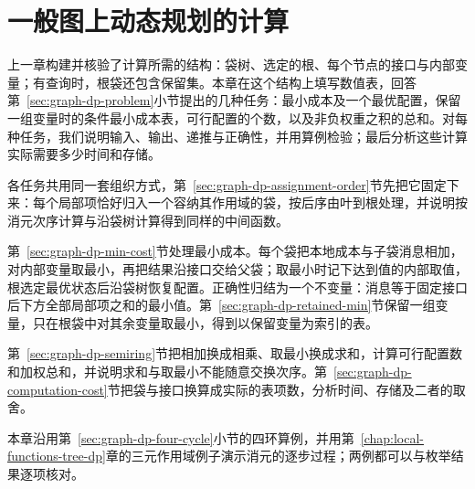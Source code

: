 \chapter{一般图上动态规划的计算}
\label{sec:graph-bag-dp}
\label{chap:general-graph-dp-computation}

上一章构建并核验了计算所需的结构：袋树、选定的根、每个节点的接口与内部变量；有查询时，根袋还包含保留集。本章在这个结构上填写数值表，回答第~\ref{sec:graph-dp-problem}小节提出的几种任务：最小成本及一个最优配置，保留一组变量时的条件最小成本表，可行配置的个数，以及非负权重之积的总和。对每种任务，我们说明输入、输出、递推与正确性，并用算例检验；最后分析这些计算实际需要多少时间和存储。

各任务共用同一套组织方式，第~\ref{sec:graph-dp-assignment-order}节先把它固定下来：每个局部项恰好归入一个容纳其作用域的袋，按后序由叶到根处理，并说明按消元次序计算与沿袋树计算得到同样的中间函数。

第~\ref{sec:graph-dp-min-cost}节处理最小成本。每个袋把本地成本与子袋消息相加，对内部变量取最小，再把结果沿接口交给父袋；取最小时记下达到值的内部取值，根选定最优状态后沿袋树恢复配置。正确性归结为一个不变量：消息等于固定接口后下方全部局部项之和的最小值。第~\ref{sec:graph-dp-retained-min}节保留一组变量，只在根袋中对其余变量取最小，得到以保留变量为索引的表。

第~\ref{sec:graph-dp-semiring}节把相加换成相乘、取最小换成求和，计算可行配置数和加权总和，并说明求和与取最小不能随意交换次序。第~\ref{sec:graph-dp-computation-cost}节把袋与接口换算成实际的表项数，分析时间、存储及二者的取舍。

本章沿用第~\ref{sec:graph-dp-four-cycle}小节的四环算例，并用第~\ref{chap:local-functions-tree-dp}章的三元作用域例子演示消元的逐步过程；两例都可以与枚举结果逐项核对。







